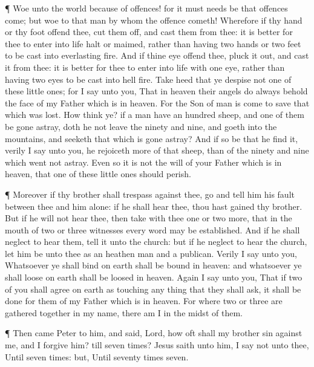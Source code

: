  ¶ Woe unto the world because of offences! for it must needs
be that offences come; but woe to that man by whom the offence cometh!
 Wherefore if thy hand or thy foot offend thee, cut them
off, and cast them from thee: it is better for thee to enter into life
halt or maimed, rather than having two hands or two feet to be cast into
everlasting fire.  And if thine eye offend thee, pluck it
out, and cast it from thee: it is better for thee to enter into life
with one eye, rather than having two eyes to be cast into hell fire.
 Take heed that ye despise not one of these little ones;
for I say unto you, That in heaven their angels do always behold the
face of my Father which is in heaven.  For the Son of man
is come to save that which was lost.  How think ye? if a
man have an hundred sheep, and one of them be gone astray, doth he not
leave the ninety and nine, and goeth into the mountains, and seeketh
that which is gone astray?  And if so be that he find it,
verily I say unto you, he rejoiceth more of that sheep, than of the
ninety and nine which went not astray.  Even so it is not
the will of your Father which is in heaven, that one of these little
ones should perish.

 ¶ Moreover if thy brother shall trespass against thee, go
and tell him his fault between thee and him alone: if he shall hear
thee, thou hast gained thy brother.  But if he will not
hear thee, then take with thee one or two more, that in the mouth of two
or three witnesses every word may be established.  And if
he shall neglect to hear them, tell it unto the church: but if he
neglect to hear the church, let him be unto thee as an heathen man and a
publican.  Verily I say unto you, Whatsoever ye shall bind
on earth shall be bound in heaven: and whatsoever ye shall loose on
earth shall be loosed in heaven.  Again I say unto you,
That if two of you shall agree on earth as touching any thing that they
shall ask, it shall be done for them of my Father which is in heaven.
 For where two or three are gathered together in my name,
there am I in the midst of them.

 ¶ Then came Peter to him, and said, Lord, how oft shall my
brother sin against me, and I forgive him? till seven times?
 Jesus saith unto him, I say not unto thee, Until seven
times: but, Until seventy times seven.

